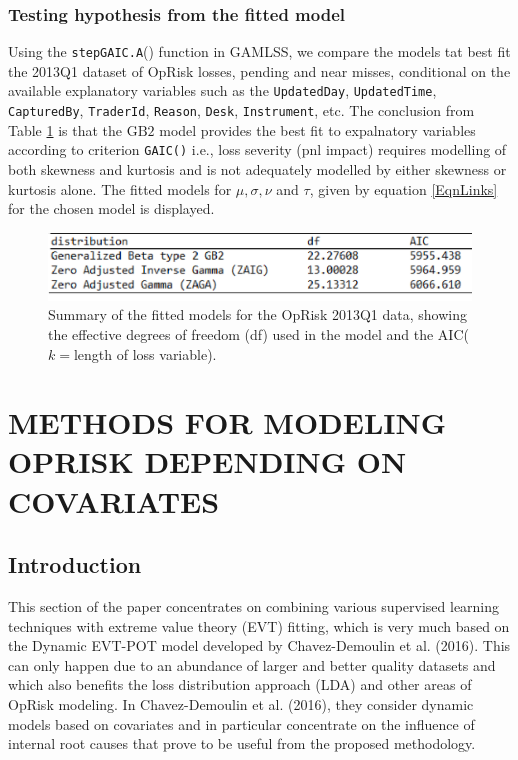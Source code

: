 \documentclass{DissertateUSU}
\begin{document}
\subsection{Testing hypothesis from the fitted model}

Using the \texttt{stepGAIC.A}() function in GAMLSS, we compare the
models tat best fit the 2013Q1 dataset of OpRisk losses, pending and
near misses, conditional on the available explanatory variables such as
the \texttt{UpdatedDay}, \texttt{UpdatedTime}, \texttt{CapturedBy},
\texttt{TraderId}, \texttt{Reason}, \texttt{Desk}, \texttt{Instrument},
etc. The conclusion from Table \ref{GAIC} is that the \(\mbox{GB}2\)
model provides the best fit to expalnatory variables according to
criterion \texttt{GAIC()} i.e., loss severity (pnl impact) requires
modelling of both skewness and kurtosis and is not adequately modelled
by either skewness or kurtosis alone. The fitted models for
\(\mu,\sigma,\nu\) and \(\tau\), given by equation \ref{EqnLinks} for
the chosen model is displayed.

\begin{figure}
\centering
\includegraphics[scale=1.0]{GAIC.eps}
\caption[Summary of fitted models]{Summary of the fitted models for the OpRisk 2013Q1 data, showing the effective degrees of freedom (df) used in the model and the AIC($k=$length of loss variable).}
\label{GAIC}
\end{figure}

\singlespacing

\FloatBarrier
\newpage
{}
\fancyhead[R]{\thepage}
\fancyfoot[C]{}

\chapter{METHODS FOR MODELING OPRISK DEPENDING ON COVARIATES}
\label{METHODS FOR MODELING OPRISK DEPENDING ON COVARIATES}

\doublespacing

\section{Introduction}
\label{sec:Introduction}

This section of the paper concentrates on combining various supervised
learning techniques with extreme value theory (EVT) fitting, which is
very much based on the Dynamic EVT-POT model developed by
Chavez-Demoulin et al. (2016). This can only happen due to an abundance
of larger and better quality datasets and which also benefits the loss
distribution approach (LDA) and other areas of OpRisk modeling. In
Chavez-Demoulin et al. (2016), they consider dynamic models based on
covariates and in particular concentrate on the influence of internal
root causes that prove to be useful from the proposed methodology.
\end{document}
